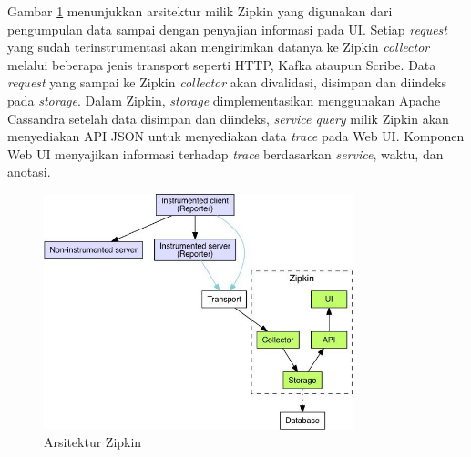 Gambar \ref{zipkin-arch} menunjukkan arsitektur milik Zipkin yang digunakan dari pengumpulan data sampai dengan penyajian informasi pada UI. Setiap \textit{request} yang sudah terinstrumentasi akan mengirimkan datanya ke Zipkin \textit{collector} melalui beberapa jenis transport seperti HTTP, Kafka ataupun Scribe. Data \textit{request} yang sampai ke Zipkin \textit{collector} akan divalidasi, disimpan dan diindeks pada \textit{storage}. Dalam Zipkin, \textit{storage} dimplementasikan menggunakan Apache Cassandra setelah data disimpan dan diindeks, \textit{service query} milik Zipkin akan menyediakan API JSON untuk menyediakan data \textit{trace} pada Web UI. Komponen Web UI menyajikan informasi terhadap \textit{trace} berdasarkan \textit{service}, waktu, dan anotasi.
\begin{figure}[htb]
	\centering
	\includegraphics[width=0.8\textwidth]{resources/ch2/zipkin-arch.png}
	\caption{Arsitektur Zipkin \citep{zipkin}}
	\label{zipkin-arch}
\end{figure}







